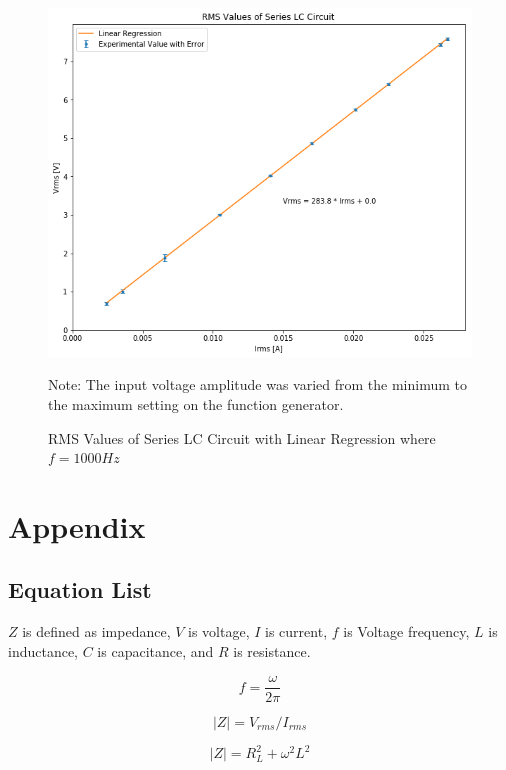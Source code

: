 \documentclass[]{article}
\newcommand{\getFrequency}{$f = 1000 Hz$}
\begin{document}
\begin{figure}[H]
    \label{fig:ser}
    \includegraphics[width=\textwidth]{ser.png}
    \caption{RMS Values of Series LC Circuit with Linear Regression where
    \getFrequency}

    Note: The input voltage amplitude was varied from the minimum to the maximum
    setting on the function generator.
\end{figure}


\section*{Appendix}

\subsection*{Equation List} 
$Z$ is defined as impedance, $V$ is voltage, $I$ is current, $f$ is
Voltage frequency, $L$ is inductance, $C$ is capacitance, and $R$ is resistance.

\begin{equation}
    f = \frac{\omega}{2 \pi}
\end{equation}

\begin{equation} \label{eq1} 
    |Z| = V_{rms}/I_{rms} 
\end{equation}

\begin{equation} \label{eq2} 
    |Z| = R_{L}^2 + \omega^2 L^2
\end{equation}
\end{document}
